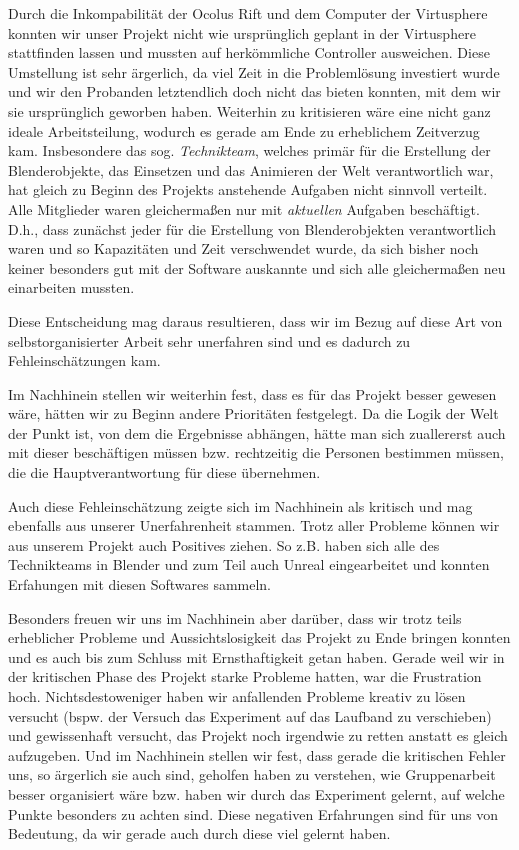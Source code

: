 \documentclass{Bericht}
\begin{document}
	Durch die Inkompabilität der Ocolus Rift und dem Computer der Virtusphere konnten wir unser Projekt nicht wie ursprünglich geplant in der Virtusphere stattfinden lassen und mussten auf herkömmliche Controller ausweichen. Diese Umstellung ist sehr ärgerlich, da viel Zeit in die Problemlösung investiert wurde und wir den Probanden letztendlich doch nicht das bieten konnten, mit dem wir sie ursprünglich geworben haben. 
	Weiterhin zu kritisieren wäre eine nicht ganz ideale Arbeitsteilung, wodurch es gerade am Ende zu erheblichem Zeitverzug kam. Insbesondere das sog. \textit{Technikteam}, welches primär für die Erstellung der Blenderobjekte, das Einsetzen und das Animieren der Welt verantwortlich war, hat gleich zu Beginn des Projekts anstehende Aufgaben nicht sinnvoll verteilt. Alle Mitglieder waren gleichermaßen nur mit \textit{aktuellen} Aufgaben beschäftigt. D.h., dass zunächst jeder für die Erstellung von Blenderobjekten verantwortlich waren und so Kapazitäten und Zeit verschwendet wurde, da sich bisher noch keiner besonders gut mit der Software auskannte und sich alle gleichermaßen neu einarbeiten mussten.
	
	Diese Entscheidung mag daraus resultieren, dass wir im Bezug auf diese Art von selbstorganisierter Arbeit sehr unerfahren sind und es dadurch zu Fehleinschätzungen kam.
	
	Im Nachhinein stellen wir weiterhin fest, dass es für das Projekt besser gewesen wäre, hätten wir zu Beginn andere Prioritäten festgelegt. Da die Logik der Welt der Punkt ist, von dem die Ergebnisse abhängen, hätte man sich zuallererst auch mit dieser beschäftigen müssen bzw. rechtzeitig die Personen bestimmen müssen, die die Hauptverantwortung für diese übernehmen.
	
	Auch diese Fehleinschätzung zeigte sich im Nachhinein als kritisch und mag ebenfalls aus unserer Unerfahrenheit stammen.
	Trotz aller Probleme können wir aus unserem Projekt auch Positives ziehen. So z.B. haben sich alle des Technikteams in Blender und zum Teil auch Unreal eingearbeitet und konnten Erfahungen mit diesen Softwares sammeln.
	
	Besonders freuen wir uns im Nachhinein aber darüber, dass wir trotz teils erheblicher Probleme und Aussichtslosigkeit das Projekt zu Ende bringen konnten und es auch bis zum Schluss mit Ernsthaftigkeit getan haben. Gerade weil wir in der kritischen Phase des Projekt starke Probleme hatten, war die Frustration hoch. Nichtsdestoweniger haben wir anfallenden Probleme kreativ zu lösen versucht (bspw. der Versuch das Experiment auf das Laufband zu verschieben) und gewissenhaft versucht, das Projekt noch irgendwie zu retten anstatt es gleich aufzugeben. Und im Nachhinein stellen wir fest, dass gerade die kritischen Fehler uns, so ärgerlich sie auch sind, geholfen haben zu verstehen, wie Gruppenarbeit besser organisiert wäre bzw. haben wir durch das Experiment gelernt, auf welche Punkte besonders zu achten sind. Diese negativen Erfahrungen sind für uns von Bedeutung, da wir gerade auch durch diese viel gelernt haben.
	
\end{document}
